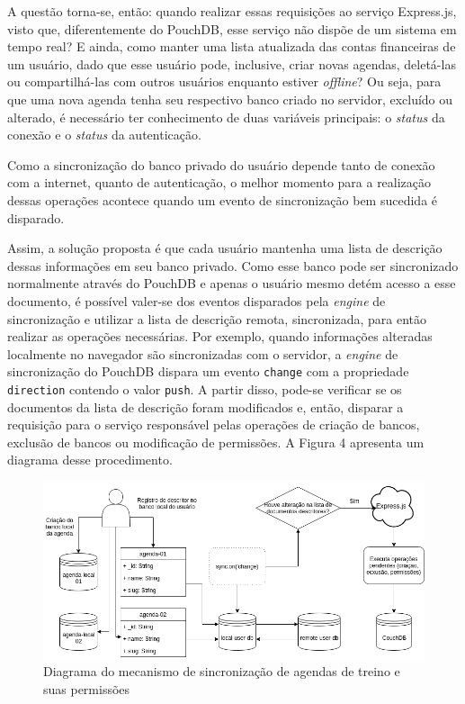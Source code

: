 \documentclass[
	article,			%
	11pt,				%
	oneside,			%
	a4paper,			%
	english,			%
	brazil,				%
	sumario=tradicional
	]{abntex2}
\begin{document}
A questão torna-se, então: quando realizar essas requisições ao serviço Express.js, visto que, diferentemente do PouchDB, esse serviço não dispõe de um sistema em tempo real? E ainda, como manter uma lista atualizada das contas financeiras de um usuário, dado que esse usuário pode, inclusive, criar novas agendas, deletá-las ou compartilhá-las com outros usuários enquanto estiver \textit{offline}? Ou seja, para que uma nova agenda tenha seu respectivo banco criado no servidor, excluído ou alterado, é necessário ter conhecimento de duas variáveis principais: o \textit{status} da conexão e o \textit{status} da autenticação.

Como a sincronização do banco privado do usuário depende tanto de conexão com a internet, quanto de autenticação, o melhor momento para a realização dessas operações acontece quando um evento de sincronização bem sucedida é disparado.

Assim, a solução proposta é que cada usuário mantenha uma lista de descrição dessas informações em seu banco privado. Como esse banco pode ser sincronizado normalmente através do PouchDB e apenas o usuário mesmo detém acesso a esse documento, é possível valer-se dos eventos disparados pela \textit{engine} de sincronização e utilizar a lista de descrição remota, sincronizada, para então realizar as operações necessárias. Por exemplo, quando informações alteradas localmente no navegador são sincronizadas com o servidor, a \textit{engine} de sincronização do PouchDB dispara um evento \texttt{change} com a propriedade \texttt{direction} contendo o valor \texttt{push}. A partir disso, pode-se verificar se os documentos da lista de descrição foram modificados e, então, disparar a requisição para o serviço responsável pelas operações de criação de bancos, exclusão de bancos ou modificação de permissões. A Figura 4 apresenta um diagrama desse procedimento.

\begin{figure}[H]
	\centering
	\caption{Diagrama do mecanismo de sincronização de agendas de treino e suas permissões}
	\includegraphics[width=1\textwidth]{figures/riffnailer-sync-database-creation}
\end{figure}
\end{document}
